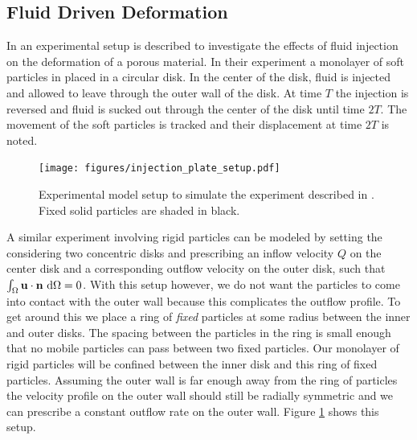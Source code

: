 \documentclass[preprint, 10pt]{elsarticle}
\begin{document}


\FloatBarrier
\subsection{Fluid Driven Deformation}

In \cite{MacMinn2015} an experimental setup is described to investigate the
effects of fluid injection on the deformation of a porous material. In their
experiment a monolayer of soft particles in placed in a circular disk. In the
center of the disk, fluid is injected and allowed to leave through the outer
wall of the disk. At time $T$ the injection is reversed and fluid is sucked out
through the center of the disk until time $2T$. The movement of the soft
particles is tracked and their displacement at time $2T$ is noted.

\begin{figure}[h!]
\begin{center}
\texttt{[image: figures/injection\_plate\_setup.pdf]}
\end{center}
\caption{Experimental model setup to simulate the experiment described in
\cite{MacMinn2015}. Fixed solid particles are shaded in
black.}\label{fig:radial}
\end{figure}

A similar experiment involving rigid particles can be modeled by setting the
considering two concentric disks and prescribing an inflow velocity $Q$ on the
center disk and a corresponding outflow velocity on the outer disk, such that
$\int_\Omega {\mathbf{u}}\cdot{\mathbf{n}}~\text{d}\Omega = 0$. With this setup however, we do not want the particles
to come into contact with the outer wall because this
complicates the outflow profile. To get around this we place a ring of
\textit{fixed} particles at some radius between the inner and outer disks. The
spacing between the particles in the ring is small enough that no mobile
particles can pass between two fixed particles. Our monolayer of rigid particles
will be confined between the inner disk and this ring of fixed particles.
Assuming the outer wall is far enough away from the ring of particles the
velocity profile on the outer wall should still be radially symmetric and we can prescribe a
constant outflow rate on the outer wall. Figure \ref{fig:radial}
shows this setup.
\end{document}
